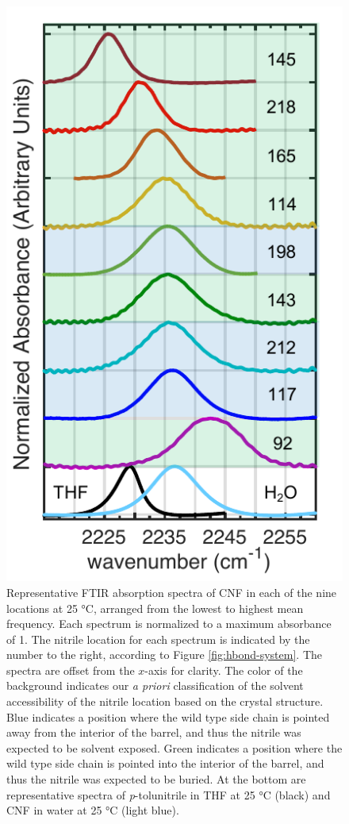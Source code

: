 \begin{figure}
    \center
    \includegraphics[width=\single]{figures-gfp-hbond/spectra_colors.pdf}
    \caption[FTIR spectra of CNF at each nitrile location]{
        Representative FTIR absorption spectra of CNF in each of the nine locations at 25 \si{\celsius}, arranged from the lowest to highest mean frequency. 
        Each spectrum is normalized to a maximum absorbance of 1. 
        The nitrile location for each spectrum is indicated by the number to the right, according to Figure \ref{fig:hbond-system}. 
        The spectra are offset from the $x$-axis for clarity. 
        The color of the background indicates our \emph{a priori} classification of the solvent accessibility of the nitrile location based on the crystal structure. 
        Blue indicates a position where the wild type side chain is pointed away from the interior of the barrel, and thus the nitrile was expected to be solvent exposed. 
        Green indicates a position where the wild type side chain is pointed into the interior of the barrel, and thus the nitrile was expected to be buried. 
        At the bottom are representative spectra of \emph{p}-tolunitrile in THF at 25 \si{\celsius} (black) and CNF in water at 25 \si{\celsius} (light blue).
    }
    \label{fig:hbond-spectra}
\end{figure}

